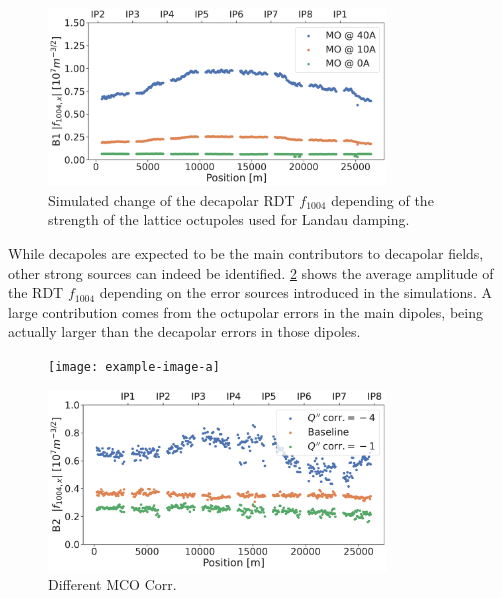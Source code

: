 \begin{figure}[!htb]
    \centering
    \includegraphics[width=0.8\textwidth]{./images/f1004/f1004_mo.pdf}
    \caption{Simulated change of the decapolar RDT $f_{1004}$ depending of the strength of the
    lattice octupoles used for Landau damping.}
    \label{fig:decapoles:rdts:simulation_mo_powered}
\end{figure}

While decapoles are expected to be the main contributors to decapolar fields, other strong sources
can indeed be identified. \cref{fig:decapoles:rdts:contributions} shows the average amplitude of the
RDT $f_{1004}$ depending on the error sources introduced in the simulations. A large contribution
comes from the octupolar errors in the main dipoles, being actually larger than the decapolar errors
in those dipoles.

\begin{figure}[!htb]
    \centering
    \texttt{[image: example-image-a]}
    \caption{}
    \label{fig:decapoles:rdts:contributions}
\end{figure}


\begin{figure}[!htb]
    \centering
    \includegraphics[width=0.8\textwidth]{./images/f1004/f1004x_mco_corr.pdf}
    \caption{Different MCO Corr.}
    \label{decapoles:rdts:measured_f1004_mco}
\end{figure}
